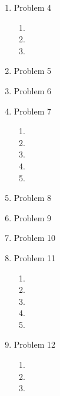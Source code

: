 \begin{enumerate}[leftmargin=2cm,labelsep=.5cm,label=\bf\arabic*.]

\item Problem 4
\begin{enumerate}
  \item
  \item
  \item
\end{enumerate}

\item Problem 5

\item Problem 6

\item Problem 7
\begin{enumerate}
  \item
  \item
  \item
  \item
  \item
\end{enumerate}

\item Problem 8

\item Problem 9

\item Problem 10

\item Problem 11
\begin{enumerate}
  \item
  \item
  \item
  \item
  \item
\end{enumerate}

\item Problem 12
\begin{enumerate}
  \item
  \item
  \item
\end{enumerate}

\end{enumerate}